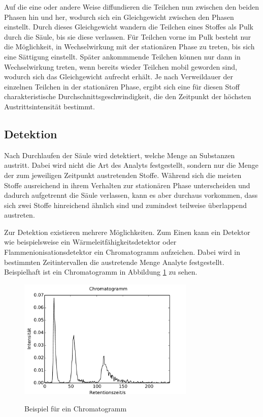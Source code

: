 Auf die eine oder andere Weise diffundieren die Teilchen nun zwischen den beiden Phasen hin und her, wodurch sich ein Gleichgewicht zwischen den Phasen einstellt. Durch dieses Gleichgewicht wandern die Teilchen eines Stoffes als Pulk durch die Säule, bis sie diese verlassen. Für Teilchen vorne im Pulk besteht nur die Möglichkeit, in Wechselwirkung mit der stationären Phase zu treten, bis sich eine Sättigung einstellt. Später ankommmende Teilchen können nur dann in Wechselwirkung treten, wenn bereits wieder Teilchen mobil geworden sind, wodurch sich das Gleichgewicht aufrecht erhält. 
Je nach Verweildauer der einzelnen Teilchen in der stationären Phase, ergibt sich eine für diesen Stoff charakteristische Durchschnittsgeschwindigkeit, die den Zeitpunkt der höchsten Austrittsintensität bestimmt.


\subsection{Detektion}
Nach Durchlaufen der Säule wird detektiert, welche Menge an Substanzen austritt. Dabei wird nicht die Art des Analyts festgestellt, sondern nur die Menge der zum jeweiligen Zeitpunkt austretenden Stoffe. Während sich die meisten Stoffe ausreichend in ihrem Verhalten zur stationären Phase unterscheiden und dadurch aufgetrennt die Säule verlassen, kann es aber durchaus vorkommen, dass sich zwei Stoffe hinreichend ähnlich sind und  zumindest teilweise überlappend austreten.

Zur Detektion existieren mehrere Möglichkeiten. Zum Einen kann ein Detektor wie beispielsweise ein Wärmeleitfähigkeitsdetektor oder Flammenionisationsdetektor ein Chromatogramm aufzeichen. Dabei wird in bestimmten Zeitintervallen die austretende Menge Analyte festgestellt. Beispielhaft ist ein Chromatogramm in Abbildung \ref{chromatogramm} zu sehen. 

\begin{figure}
 \centering
  \includegraphics[width = 0.75\textwidth]{bilder/spektrum}\\
  \caption{Beispiel für ein Chromatogramm}
  \label{chromatogramm}
\end{figure}

